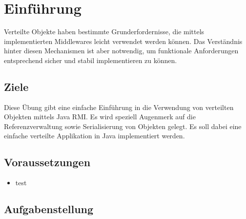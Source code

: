 
\section{Einführung}

Verteilte Objekte haben bestimmte Grunderfordernisse, die mittels implementierten Middlewares leicht verwendet werden können. Das Verständnis hinter diesen Mechanismen ist aber notwendig, um funktionale Anforderungen entsprechend sicher und stabil implementieren zu können.

\subsection{Ziele}

Diese Übung gibt eine einfache Einführung in die Verwendung von verteilten Objekten mittels Java RMI. Es wird speziell Augenmerk auf die Referenzverwaltung sowie Serialisierung von Objekten gelegt. Es soll dabei eine einfache verteilte Applikation in Java implementiert werden.

\subsection{Voraussetzungen}

\begin{itemize}
	\item test
\end{itemize}

\subsection{Aufgabenstellung}


\clearpage
